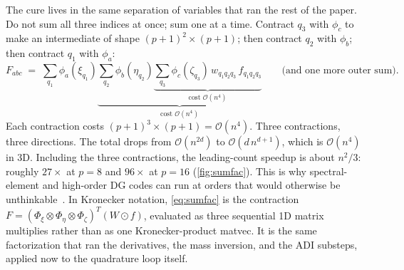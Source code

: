\documentclass[11pt]{article}
\newcommand{\kron}{\otimes}
\newcommand{\bigO}{\mathcal{O}}
\begin{document}
The cure lives in the same separation of variables that ran the rest
of the paper.  Do not sum all three indices at once; sum one at a
time.  Contract $q_3$ with $\phi_c$ to make an intermediate of shape
$(p{+}1)^2 \times (p{+}1)$; then contract $q_2$ with $\phi_b$; then
contract $q_1$ with $\phi_a$:
\begin{equation}
\label{eq:sumfac}
  F_{abc}
  \;=\;
  \sum_{q_1} \phi_a(\xi_{q_1})
  \underbrace{
  \sum_{q_2} \phi_b(\eta_{q_2})
  \underbrace{
    \sum_{q_3} \phi_c(\zeta_{q_3})\,
    w_{q_1 q_2 q_3}\, f_{q_1 q_2 q_3}
  }_{\text{cost } \bigO(n^{4})}
  }_{\text{cost } \bigO(n^{4})}
  \qquad\text{(and one more outer sum)}.
\end{equation}
Each contraction costs $(p{+}1)^3 \times (p{+}1) = \bigO(n^{4})$.
Three contractions, three directions.  The total drops from
$\bigO(n^{2d})$ to $\bigO(d\, n^{d+1})$, which is $\bigO(n^{4})$ in
3D.  Including the three contractions, the leading-count speedup is
about $n^2/3$: roughly $27\times$ at $p=8$ and $96\times$ at $p=16$
(\cref{fig:sumfac}).  This is why spectral-element and high-order DG
codes can run at orders that would otherwise be unthinkable~\citep{deville2002high}.
In Kronecker notation,
\eqref{eq:sumfac} is the contraction
$F = (\Phi_\xi \kron \Phi_\eta \kron \Phi_\zeta)^T (W\odot f)$,
evaluated as three sequential 1D matrix multiplies rather than as
one Kronecker-product matvec.  It is the same factorization that ran
the derivatives, the mass inversion, and the ADI substeps, applied
now to the quadrature loop itself.
\end{document}
